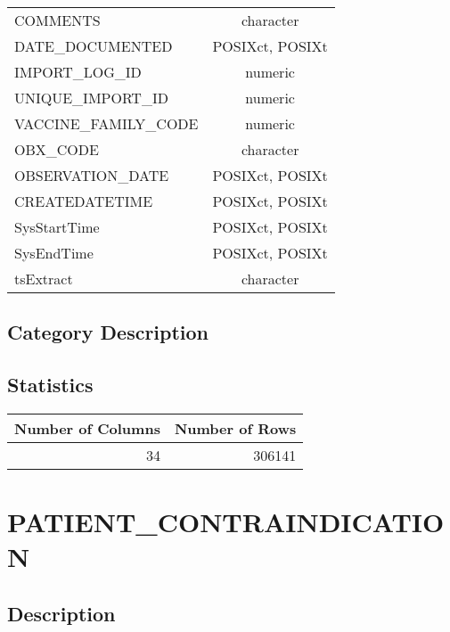 \documentclass[
  letterpaper,
  DIV=11,
  numbers=noendperiod]{scrreprt}
\begin{document}
\begin{longtable}{lc}
COMMENTS & character \\ 
DATE\_DOCUMENTED & POSIXct, POSIXt \\ 
IMPORT\_LOG\_ID & numeric \\ 
UNIQUE\_IMPORT\_ID & numeric \\ 
VACCINE\_FAMILY\_CODE & numeric \\ 
OBX\_CODE & character \\ 
OBSERVATION\_DATE & POSIXct, POSIXt \\ 
CREATEDATETIME & POSIXct, POSIXt \\ 
SysStartTime & POSIXct, POSIXt \\ 
SysEndTime & POSIXct, POSIXt \\ 
tsExtract & character \\ 
\bottomrule
\end{longtable}

\hypertarget{category-description-25}{%
\section*{Category Description}\label{category-description-25}}

\hypertarget{statistics-25}{%
\section*{Statistics}\label{statistics-25}}

\begin{longtable}{rr}
\toprule
Number of Columns & Number of Rows \\ 
\midrule
34 & 306141 \\ 
\bottomrule
\end{longtable}

\hypertarget{patient_contraindication}{%
\chapter*{PATIENT\_CONTRAINDICATION}\label{patient_contraindication}}

\hypertarget{description-26}{%
\section*{Description}\label{description-26}}
\end{document}
